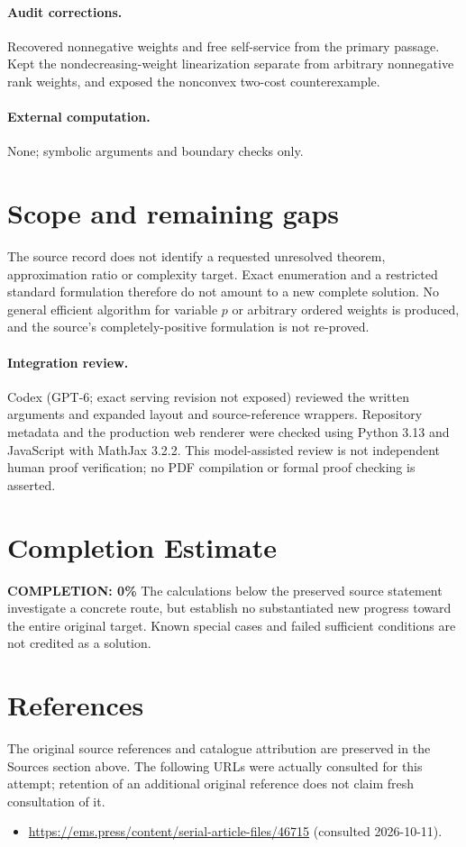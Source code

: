 \documentclass[11pt]{article}
\begin{document}
\paragraph{Audit corrections.} Recovered nonnegative weights and free self-service from the primary passage. Kept the nondecreasing-weight linearization separate from arbitrary nonnegative rank weights, and exposed the nonconvex two-cost counterexample.
\paragraph{External computation.} None; symbolic arguments and boundary checks only.
\section{Scope and remaining gaps}
The source record does not identify a requested unresolved theorem, approximation ratio or complexity target. Exact enumeration and a restricted standard formulation therefore do not amount to a new complete solution. No general efficient algorithm for variable $p$ or arbitrary ordered weights is produced, and the source's completely-positive formulation is not re-proved.
\paragraph{Integration review.} Codex (GPT-6; exact serving revision not exposed) reviewed the written arguments and expanded layout and source-reference wrappers. Repository metadata and the production web renderer were checked using Python 3.13 and JavaScript with MathJax 3.2.2. This model-assisted review is not independent human proof verification; no PDF compilation or formal proof checking is asserted.

\section{Completion Estimate}
\noindent\textbf{COMPLETION: 0\%}
The calculations below the preserved source statement investigate a concrete route,
but establish no substantiated new progress toward the entire original target.
Known special cases and failed sufficient conditions are not credited as a solution.
\section{References}
The original source references and catalogue attribution are preserved in the
Sources section above. The following URLs were actually consulted for this attempt;
retention of an additional original reference does not claim fresh consultation of it.
\begin{itemize}
\item \url{https://ems.press/content/serial-article-files/46715} (consulted 2026-10-11). 
\end{itemize}
\end{document}
